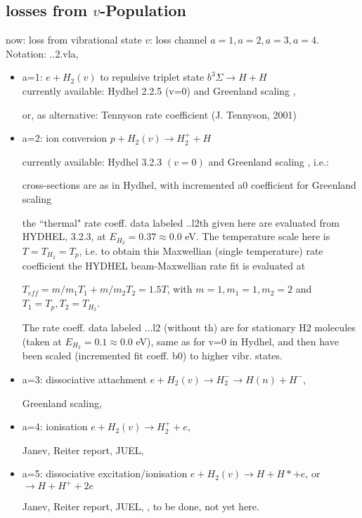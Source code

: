 \documentclass[12pt,dvipdfmx]{article}
\begin{document}
\subsection{
losses from $v$-Population
}\label{secloss}
now: loss from vibrational state $v$: loss channel $a=1, a=2, a=3, a=4$. Notation: ..2.vla,
\begin{itemize}

\item{a=1}: $e + H_2(v) $ to repulsive triplet state $b^3\Sigma \rightarrow H+H $ \\

     currently available: Hydhel 2.2.5 (v=0) and Greenland scaling \cite{kn:Green},

                      or, as alternative: Tennyson rate coefficient (J. Tennyson, 2001)

\item{a=2}: ion conversion $p+H_2(v) \rightarrow H_2^+  +  H$

     currently available: Hydhel 3.2.3 $(v=0)$ and Greenland scaling \cite{kn:Green}, i.e.:

     cross-sections are as in Hydhel, with incremented a0 coefficient for Greenland scaling

     the ``thermal" rate coeff. data labeled ..l2th given here are evaluated from HYDHEL, 3.2.3, at $E_{H_2}=0.37\approx 0.0$ eV. The temperature scale here
     is $T=T_{H_2} = T_p$, i.e. to obtain this Maxwellian (single temperature) rate coefficient the HYDHEL beam-Maxwellian rate fit is evaluated at

     $T_{eff}= m/m_1 T_1 + m/m_2 T_2 = 1.5 T$, with $m=1, m_1=1, m_2=2$
     and $T_1=T_p, T_2=T_{H_2}$.

     The rate coeff. data labeled ...l2  (without th) are for stationary H2 molecules (taken at $E_{H_2}=0.1\approx 0.0$ eV), same as for v=0 in Hydhel, and then
     have been scaled (incremented fit coeff. b0) to higher vibr. states.

\item{a=3}: dissociative attachment  $e + H_2(v) \rightarrow H_2^- \rightarrow H(n) + H^-$,

Greenland scaling, \cite{kn:Green}

\item{a=4}: ionisation $e + H_2(v) \rightarrow H_2^+  + e$,

Janev, Reiter report, JUEL, \cite{kn:JRS}

\item{a=5}: dissociative excitation/ionisation $e + H_2(v) \rightarrow H + H*  + e$, or
$\rightarrow H + H^+ + 2e$

Janev, Reiter report, JUEL, \cite{kn:JRS}, to be done, not yet here.
\end{itemize}
\newpage
\end{document}
